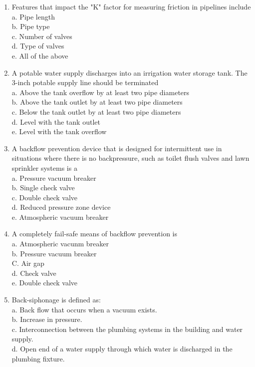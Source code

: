 \begin{enumerate}[1.]
\item Features that impact the "K" factor for measuring friction in pipelines include\\
a. Pipe length\\
b. Pipe type\\
c. Number of valves\\
d. Type of valves\\
e. All of the above\\

\item A potable water supply discharges into an irrigation water storage tank. The 3-inch potable supply line should be terminated\\
a. Above the tank overflow by at least two pipe diameters\\
b. Above the tank outlet by at least two pipe diameters\\
c. Below the tank outlet by at least two pipe diameters\\
d. Level with the tank outlet\\
e. Level with the tank overflow\\

\item A backflow prevention device that is designed for intermittent use in situations where there is no backpressure, such as toilet flush valves and lawn sprinkler systems is a\\
a. Pressure vacuum breaker\\
b. Single check valve\\
c. Double check valve\\
d. Reduced pressure zone device\\
e. Atmospheric vacuum breaker\\

\item A completely fail-safe means of backflow prevention is\\
a. Atmospheric vacunm breaker\\
b. Pressure vacuum breaker\\
C. Air gap\\
d. Check valve\\
e. Double check valve\\

\item Back-siphonage is defined as:\\
a. Back flow that occurs when a vacuum exists.\\
b. Increase in pressure.\\
c. Interconnection between the plumbing systems in the building and water supply.\\
d. Open end of a water supply through which water is discharged in the plumbing fixture.\\


\end{enumerate}
